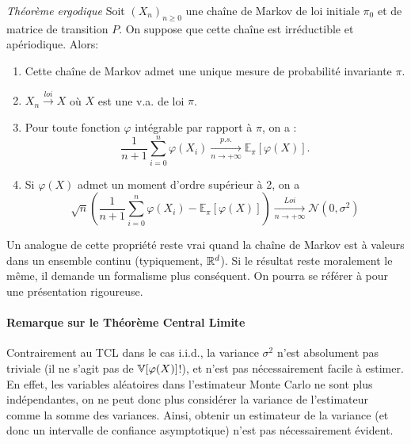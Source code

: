 \begin{propriete}{\textit{Théorème ergodique}}
\label{prop:theo:ergo}
Soit $(X_n)_{n\geq 0}$ une chaîne de Markov de loi initiale $\pi_0$ et de matrice de transition $P$. On suppose que cette chaîne est  irréductible et apériodique.
Alors: 

\begin{enumerate}
\item Cette chaîne de Markov admet une unique mesure de probabilité invariante $\pi$.
\item $X_n \overset{loi}{\longrightarrow} X$ où $X$ est une v.a. de loi $\pi$.
\item Pour toute fonction $\varphi$ intégrable par rapport à $\pi$, on a :
$$\frac{1}{n + 1} \sum_{i = 0}^n \varphi(X_i) \underset{n \rightarrow +\infty}{\overset{p.s.}{\longrightarrow}} \mathbb{E}_\pi[\varphi(X)].$$
\item Si $\varphi(X)$ admet un moment d'ordre supérieur à 2, on a
 $$\sqrt{n}\left( \frac{1}{n + 1}\sum_{i = 0}^n \varphi(X_i) - \mathbb{E}_\pi[\varphi(X)] \right) \underset{n \rightarrow +\infty}{\overset{Loi}{\longrightarrow}} \mathcal{N}(0, \sigma^2)$$
\end{enumerate}
\end{propriete}

Un analogue de cette propriété reste vrai quand la chaîne de Markov est à valeurs dans un ensemble continu (typiquement, $\mathbb{R}^d$). Si le résultat reste moralement le même, il demande un formalisme plus conséquent. On pourra se référer à \citep{robert2013monte} pour une présentation rigoureuse.

\paragraph{Remarque sur le Théorème Central Limite}
Contrairement au TCL dans le cas i.i.d., la variance $\sigma^2$ n'est absolument pas triviale (il ne s'agit pas de $\mathbb{V}[\varphi(X)]$!), et n'est pas nécessairement facile à estimer. En effet, les variables aléatoires dans l'estimateur Monte Carlo ne sont plus indépendantes, on ne peut donc plus considérer la variance de l'estimateur comme la somme des variances. Ainsi, obtenir un estimateur de la variance (et donc un intervalle de confiance asymptotique) n'est pas nécessairement évident.

